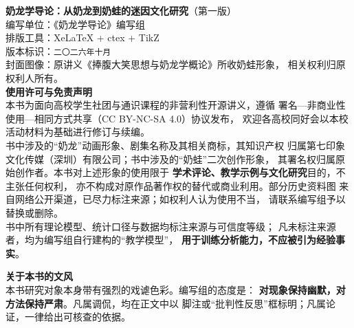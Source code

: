 \documentclass[UTF8,11pt,openany,oneside]{ctexbook}
\newcommand{\BookEdition}{第一版}
\newcommand{\BookDate}{二〇二六年十月}
\begin{document}


\thispagestyle{empty}
\vspace*{\fill}
{\footnotesize\color{NLGrey}
\noindent\textbf{奶龙学导论：从奶龙到奶蛙的迷因文化研究}（\BookEdition）\\[0.6em]
\noindent 编写单位：《奶龙学导论》编写组\\[0.3em]
\noindent 排版工具：XeLaTeX + ctex + TikZ\\[0.3em]
\noindent 版本标识：\texttt{\BookDate}\\
\noindent 封面图像：原讲义《捧腹大笑思想与奶龙学概论》所收奶蛙形象，
相关权利归原权利人所有。\\

\vspace{1.2em}
\noindent\textbf{使用许可与免责声明}\\[0.4em]
\noindent 本书为面向高校学生社团与通识课程的非营利性开源讲义，遵循
署名—非商业性使用—相同方式共享（CC BY-NC-SA 4.0）协议发布，
欢迎各高校同好会以本校活动材料为基础进行修订与续编。\\[0.4em]
\noindent 书中涉及的“奶龙”动画形象、剧集名称及其相关商标，其知识产权
归属第七印象文化传媒（深圳）有限公司；书中涉及的“奶蛙”二次创作形象，
其署名权归属原始创作者。本书对上述形象的使用限于
\textbf{学术评论、教学示例与文化研究}目的，不主张任何权利，
亦不构成对原作品著作权的替代或商业利用。部分历史资料图
来自网络公开渠道，已尽力标注来源；如权利人认为使用不当，
请联系编写组予以替换或删除。\\[0.4em]
\noindent 书中所有理论模型、统计口径与数据均标注来源与可信度等级；
凡未标注来源者，均为编写组自行建构的“教学模型”，
\textbf{用于训练分析能力，不应被引为经验事实}。

\vspace{1.2em}
\noindent\textbf{关于本书的文风}\\[0.4em]
\noindent 本书研究对象本身带有强烈的戏谑色彩。编写组的态度是：
\textbf{对现象保持幽默，对方法保持严肃}。凡属调侃，均在正文中以
脚注或“批判性反思”框标明；凡属论证，一律给出可核查的依据。
}

\clearpage

\frontmatter
\pagestyle{fancy}


\cleardoublepage
{}
\tableofcontents
\clearpage
\listoffigures
\clearpage
\listoftables
\end{document}
